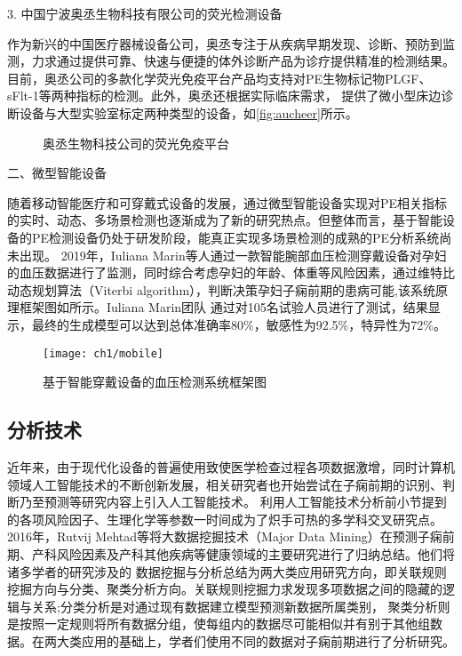 3. 中国宁波奥丞生物科技有限公司的荧光检测设备

作为新兴的中国医疗器械设备公司，奥丞专注于从疾病早期发现、诊断、预防到监测，力求通过提供可靠、快速与便捷的体外诊断产品为诊疗提供精准的检测结果。
目前，奥丞公司的多款化学荧光免疫平台产品均支持对PE生物标记物PLGF、sFlt-1等两种指标的检测\cite{aucheer2021}。此外，奥丞还根据实际临床需求，
提供了微小型床边诊断设备与大型实验室标定两种类型的设备，如\autoref{fig:aucheer}所示。
\begin{figure}[h]
    \centering
    \quad
    \caption{\label{fig:aucheer}奥丞生物科技公司的荧光免疫平台}
\end{figure}


二、微型智能设备

随着移动智能医疗和可穿戴式设备的发展，通过微型智能设备实现对PE相关指标的实时、动态、多场景检测也逐渐成为了新的研究热点。但整体而言，基于智能设备的PE检测设备仍处于研发阶段，能真正实现多场景检测的成熟的PE分析系统尚未出现。
2019年，Iuliana Marin等人\cite{Marin2019,Marin2020}通过一款智能腕部血压检测穿戴设备对孕妇的血压数据进行了监测，同时综合考虑孕妇的年龄、体重等风险因素，通过维特比动态规划算法（Viterbi algorithm），判断决策孕妇子痫前期的患病可能,该系统原理框架图如所示。Iuliana Marin团队
通过对105名试验人员进行了测试，结果显示，最终的生成模型可以达到总体准确率80\%，敏感性为92.5\%，特异性为72\%\cite{Marin2019}。
\begin{figure}[htbp]
    \centering
    \texttt{[image: ch1/mobile]}
    \caption{\label{fig:mobile}基于智能穿戴设备的血压检测系统框架图}
\end{figure}

\subsection{分析技术}
近年来，由于现代化设备的普遍使用致使医学检查过程各项数据激增，同时计算机领域人工智能技术的不断创新发展，相关研究者也开始尝试在子痫前期的识别、判断乃至预测等研究内容上引入人工智能技术。
利用人工智能技术分析前小节提到的各项风险因子、生理化学等参数一时间成为了炽手可热的多学科交叉研究点。
2016年，Rutvij Mehtad等\cite{Mehta2016}将大数据挖掘技术（Major Data Mining）在预测子痫前期、产科风险因素及产科其他疾病等健康领域的主要研究进行了归纳总结。他们将诸多学者的研究涉及的
数据挖掘与分析总结为两大类应用研究方向，即关联规则挖掘方向与分类、聚类分析方向。关联规则挖掘力求发现多项数据之间的隐藏的逻辑与关系;分类分析是对通过现有数据建立模型预测新数据所属类别，
聚类分析则是按照一定规则将所有数据分组，使每组内的数据尽可能相似并有别于其他组数据\cite{Han2006}。在两大类应用的基础上，学者们使用不同的数据对子痫前期进行了分析研究。

